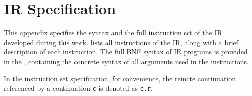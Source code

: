 \chapter{IR Specification}
\label{chapter:appendixIR}

This appendix specifies the syntax and the full instruction set of the \acf{IR} developed during this work.  lists all instructions of the \ac{IR}, along with a brief description of each instruction. The full BNF syntax of \ac{IR} programs is provided in the , containing the concrete syntax of all arguments used in the instructions.

In the instruction set specification, for convenience, the remote continuation referenced by a continuation \texttt{c} is denoted as \texttt{c.r}.

